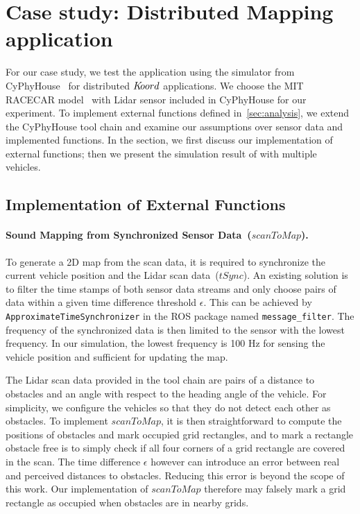 \newcommand{\Koord}{\ensuremath{\lgname}\xspace}
\newcommand{\CyPhyHouse}{CyPhyHouse\xspace}
\newcommand{\Gazebo}{Gazebo\xspace}

\newcommand{\ScanToMap}{\ensuremath{\mathit{scanToMap}}\xspace}
\newcommand{\TSync}{\ensuremath{\mathit{tSync}}\xspace}
\newcommand{\PathToFrontier}{\ensuremath{\mathit{pickPathToFrontier}}\xspace}

\section{Case study: Distributed Mapping application}
\label{sec:experims}

For our case study, we test the \dmap application using the simulator from \CyPhyHouse~\cite{ghosh2019cyphyhouse} for distributed \Koord applications.
We choose the MIT RACECAR model~\cite{MIT_RACECAR} with Lidar sensor included in \CyPhyHouse for our experiment.
To implement external functions defined in~\ref{sec:analysis},
we extend the \CyPhyHouse tool chain and examine our assumptions over sensor data and implemented functions.
In the section, we first discuss our implementation of external functions;
then we present the simulation result of \dmap with multiple vehicles.


\subsection{Implementation of External Functions}

\paragraph{Sound Mapping from Synchronized Sensor Data~(\ScanToMap).}
To generate a 2D map from the scan data,
it is required to synchronize the current vehicle position and the Lidar scan data~(\TSync).
An existing solution is to filter the time stamps of both sensor data streams
and only choose pairs of data within a given time difference threshold $\epsilon$.
This can be achieved by \texttt{ApproximateTimeSynchronizer} in the ROS package named \texttt{message\_filter}.
The frequency of the synchronized data is then limited to the sensor with the lowest frequency.
In our simulation, the lowest frequency is 100 Hz for sensing the vehicle position and sufficient for updating the map.

The Lidar scan data provided in the tool chain are pairs of a distance to obstacles and an angle with respect to the heading angle of the vehicle.
For simplicity, we configure the vehicles so that they do not detect each other as obstacles.
To implement \ScanToMap, it is then straightforward to compute the positions of obstacles and mark occupied grid rectangles,
and to mark a rectangle obstacle free is to simply check if all four corners of a grid rectangle are covered in the scan.
The time difference $\epsilon$ however can introduce an error between real and perceived distances to obstacles.
Reducing this error is beyond the scope of this work.
Our implementation of \ScanToMap therefore may falsely mark a grid rectangle as occupied when obstacles are in nearby grids.

